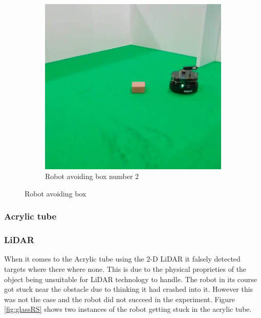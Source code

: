\begin{figure}[ht!]
\begin{subfigure}[b]{0.38\linewidth}
    \includegraphics[width=\linewidth]{imgs/chapter5/boxRS2.png}
    \caption{Robot avoiding box  number 2}
    \label{fig::nchair}
  \end{subfigure}
  \caption{Robot avoiding box}
  \label{fig:boxRS}
\end{figure}

\subsubsection{Acrylic tube}

\subsubsection*{LiDAR}
When it comes to the Acrylic tube using the 2-D \ac{LiDAR} it falsely detected targets where there where none. This is due to the physical proprieties of the object being unsuitable for \ac{LiDAR} technology to handle. The robot in its course got stuck near the obstacle due to thinking it had crashed into it. However this was not the case and the robot did not succeed in the experiment. Figure \ref{fig:glassRS} shows two instances of the robot getting stuck in the acrylic tube.

